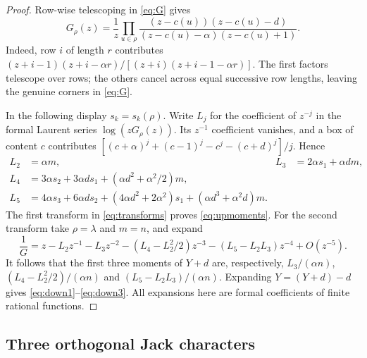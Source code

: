 \documentclass[11pt]{article}
\begin{document}
\begin{proof}
Row-wise telescoping in \eqref{eq:G} gives
\begin{equation}\label{eq:boxproduct}
 G_\rho(z)=\frac1z\prod_{u\in\rho}
 \frac{(z-c(u))(z-c(u)-d)}{(z-c(u)-\alpha)(z-c(u)+1)}.
\end{equation}
Indeed, row $i$ of length $r$ contributes
$(z+i-1)(z+i-\alpha r)/[(z+i)(z+i-1-\alpha r)]$.
The first factors telescope over rows; the others cancel across equal
successive row lengths, leaving the genuine corners in \eqref{eq:G}.

In the following display $s_k=s_k(\rho)$.
Write $L_j$ for the coefficient of $z^{-j}$ in the formal Laurent series
$\log(zG_\rho(z))$. Its $z^{-1}$ coefficient vanishes, and a box of
content $c$ contributes
$[(c+\alpha)^j+(c-1)^j-c^j-(c+d)^j]/j$. Hence
\begin{align*}
 L_2&=\alpha m,& L_3&=2\alpha s_1+\alpha dm,\\
 L_4&=3\alpha s_2+3\alpha ds_1+(\alpha d^2+\alpha^2/2)m,\\
 L_5&=4\alpha s_3+6\alpha ds_2+(4\alpha d^2+2\alpha^2)s_1
                                      +(\alpha d^3+\alpha^2d)m.
\end{align*}
The first transform in \eqref{eq:transforms} proves \eqref{eq:upmoments}.
For the second transform take $\rho=\lambda$ and $m=n$, and expand
\[
 \frac1G=z-L_2z^{-1}-L_3z^{-2}
 -(L_4-L_2^2/2)z^{-3}-(L_5-L_2L_3)z^{-4}+O(z^{-5}).
\]
It follows that the first three moments of $Y+d$ are, respectively,
$L_3/(\alpha n)$, $(L_4-L_2^2/2)/(\alpha n)$ and
$(L_5-L_2L_3)/(\alpha n)$. Expanding $Y=(Y+d)-d$ gives
\eqref{eq:down1}--\eqref{eq:down3}. All expansions here are formal
coefficients of finite rational functions.
\end{proof}

\subsection{Three orthogonal Jack characters}
\end{document}
